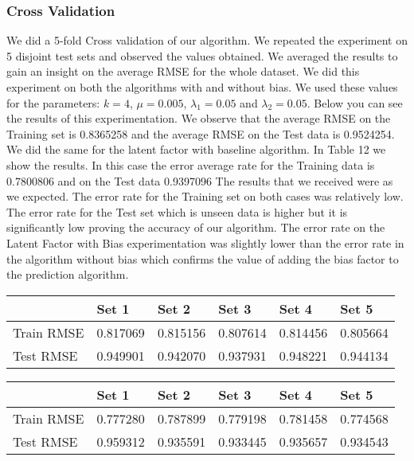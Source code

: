 \documentclass[a4paper]{article}
\begin{document}
\subsubsection*{Cross Validation}
We did a 5-fold Cross validation of our algorithm. We repeated the experiment on 5 disjoint test sets and observed the values obtained. We averaged the results to gain an insight on the average RMSE for the whole dataset. We did this experiment on both the algorithms with and without bias. We used these values for the parameters: $k = 4 $, $\mu = 0.005$, $\lambda_1 = 0.05$ and $\lambda_2 = 0.05$. Below you can see the results of this experimentation. We observe that the average RMSE on the Training set is 0.8365258 and the average RMSE on the Test data is 0.9524254. 
We did the same for the latent factor with baseline algorithm. In Table 12 we show the results. In this case the error average rate for the Training data is 0.7800806 and on the Test data 0.9397096
The results that we received were as we expected. The error rate for the Training set on both cases was relatively low. The error rate for the Test set which is unseen data is higher but it is significantly low proving the accuracy of our algorithm. The error rate on the Latent Factor with Bias experimentation was slightly lower than the error rate in the algorithm without bias which confirms the value of adding the bias factor to the prediction algorithm. 
\begin{center}
    \begin{tabular}{| l | l | l | l |l| l|}
    \hline
     & Set 1 & Set 2 & Set 3 & Set 4 & Set 5  \\ \hline
    Train RMSE & 0.817069 & 0.815156 & 0.807614 & 0.814456 & 0.805664 \\ \hline
    Test RMSE & 0.949901 & 0.942070 & 0.937931 & 0.948221 & 0.944134 \\ \hline
    \hline
    \end{tabular}
\end{center}

\begin{center}
    \begin{tabular}{| l | l | l | l |l| l|}
    \hline
     & Set 1 & Set 2 & Set 3 & Set 4 & Set 5  \\ \hline
    Train RMSE & 0.777280 & 0.787899 & 0.779198 & 0.781458 & 0.774568 \\ \hline
    Test RMSE & 0.959312 & 0.935591 & 0.933445 & 0.935657 & 0.934543 \\ \hline
    \hline
    \end{tabular}
\end{center}
\end{document}
